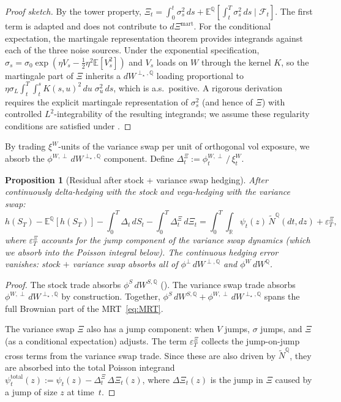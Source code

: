\documentclass[11pt,a4paper]{article}
\theoremstyle{plain}
\newtheorem{proposition}[theorem]{Proposition}
\theoremstyle{definition}
\theoremstyle{remark}
\newcommand{\E}{\mathbb{E}}
\newcommand{\R}{\mathbb{R}}
\newcommand{\QQ}{\mathbb{Q}}
\newcommand{\F}{\mathcal{F}}
\newcommand{\Ntilde}{\widetilde{N}}
\begin{document}
\begin{proof}[Proof sketch]
By the tower property,
$\Xi_t = \int_0^t \sigma_s^2\,ds
+ \E^\QQ[\int_t^T \sigma_s^2\,ds \mid \F_t]$.
The first term is adapted and does not contribute to
$d\Xi^{\mathrm{mart}}$.
For the conditional expectation, the martingale
representation theorem provides integrands against each
of the three noise sources.  Under the exponential
specification, $\sigma_s = \sigma_0\exp(\eta V_s
- \frac{1}{2}\eta^2\E[V_s^2])$ and $V_s$ loads on $W$
through the kernel $K$, so the martingale part of $\Xi$
inherits a $dW^{\perp_\star,\QQ}$ loading proportional to
$\eta\sigma_L\int_t^T\!\int_t^s K(s,u)^2\,du\;
\sigma_u^2\,ds$, which is a.s.\ positive.
A rigorous derivation requires the explicit martingale
representation of $\sigma_s^2$ (and hence of $\Xi$) with
controlled $L^2$-integrability of the resulting integrands;
we assume these regularity conditions are satisfied under
.
\end{proof}

By trading $\xi^W$-units of the variance swap per unit of
orthogonal vol exposure, we absorb the
$\phi^{W,\perp}\,dW^{\perp_\star,\QQ}$ component.  Define
$\Delta_t^\Xi :=
\phi_t^{W,\perp}\,/\,\xi_t^W$.

\begin{proposition}[Residual after stock + variance swap hedging]
\label{prop:residual-SV}
After continuously delta-hedging with the stock and vega-hedging
with the variance swap:
\begin{equation}\label{eq:SV-residual}
  h(S_T) - \E^\QQ[h(S_T)]
  - \int_0^T \Delta_t\,dS_t
  - \int_0^T \Delta_t^\Xi\,d\Xi_t
  = \int_0^T\!\!\int_\R \psi_t(z)\,\Ntilde^\QQ(dt,dz)
  + \varepsilon_T^{\Xi},
\end{equation}
where $\varepsilon_T^\Xi$ accounts for the jump component of the
variance swap dynamics (which we absorb into the Poisson integral
below).  The continuous hedging error vanishes: stock $+$ variance
swap absorbs all of $\phi^\perp\,dW^{\perp,\QQ}$ and
$\phi^W\,dW^\QQ$.
\end{proposition}

\begin{proof}
The stock trade absorbs $\phi^S\,dW^{S,\QQ}$
().  The variance swap trade absorbs
$\phi^{W,\perp}\,dW^{\perp_\star,\QQ}$ by construction.
Together, $\phi^S\,dW^{S,\QQ}
+ \phi^{W,\perp}\,dW^{\perp_\star,\QQ}$ spans the
full Brownian part of the MRT~\eqref{eq:MRT}.

The variance swap $\Xi$ also has a jump component: when $V$
jumps, $\sigma$ jumps, and $\Xi$ (as a conditional expectation)
adjusts.  The term $\varepsilon_T^\Xi$ collects the jump-on-jump
cross terms from the variance swap trade.  Since these are also
driven by $\Ntilde^\QQ$, they are absorbed into the total
Poisson integrand $\psi_t^{\mathrm{total}}(z)
:= \psi_t(z) - \Delta_t^\Xi\,\Delta\Xi_t(z)$, where
$\Delta\Xi_t(z)$ is the jump in $\Xi$ caused by a jump of
size $z$ at time~$t$.
\end{proof}
\end{document}
